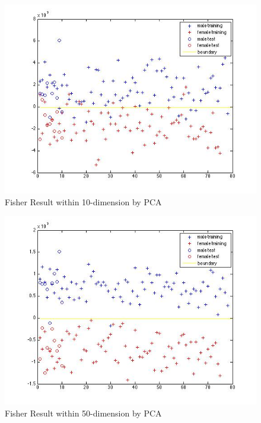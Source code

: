 \documentclass[12pt]{ctexart}
\begin{document}
\begin{enumerate}
\begin{enumerate}
\begin{figure}[H]
  \centering
  \includegraphics[scale=0.5]{a_fisher_pca10.jpg}
  \caption{Fisher Result within 10-dimension by PCA}
\end{figure}
\begin{figure}[H]
  \centering
  \includegraphics[scale=0.5]{a_fisher_pca50.jpg}
  \caption{Fisher Result within 50-dimension by PCA}
\end{figure}

\end{enumerate}


\end{enumerate}
\end{document}
